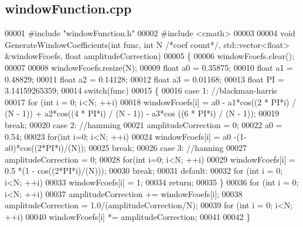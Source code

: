 \subsection{window\+Function.\+cpp}
\label{windowFunction_8cpp_source}

\begin{DoxyCode}
00001 \textcolor{preprocessor}{#include "windowFunction.h"}
00002 \textcolor{preprocessor}{#include <cmath>}
00003 
00004 \textcolor{keywordtype}{void} GenerateWindowCoefficients(\textcolor{keywordtype}{int} func, \textcolor{keywordtype}{int} N \textcolor{comment}{/*coef count*/}, std::vector<float> &windowFcoefs, \textcolor{keywordtype}{float} 
      amplitudeCorrection)
00005 \{
00006     windowFcoefs.clear();
00007 
00008     windowFcoefs.resize(N);
00009     \textcolor{keywordtype}{float} a0 = 0.35875;
00010     \textcolor{keywordtype}{float} a1 = 0.48829;
00011     \textcolor{keywordtype}{float} a2 = 0.14128;
00012     \textcolor{keywordtype}{float} a3 = 0.01168;
00013     \textcolor{keywordtype}{float} PI = 3.14159265359;
00014     \textcolor{keywordflow}{switch}(func)
00015     \{
00016     \textcolor{keywordflow}{case} 1: \textcolor{comment}{//blackman-harris}
00017             \textcolor{keywordflow}{for} (\textcolor{keywordtype}{int} i = 0; i<N; ++i)
00018                 windowFcoefs[i] = a0 - a1*cos((2 * PI*i) / (N - 1)) + a2*cos((4 * PI*i) / (N - 1)) - a3*cos
      ((6 * PI*i) / (N - 1));
00019             \textcolor{keywordflow}{break};
00020         \textcolor{keywordflow}{case} 2: \textcolor{comment}{//hamming}
00021             amplitudeCorrection = 0;
00022             a0 = 0.54;
00023             \textcolor{keywordflow}{for}(\textcolor{keywordtype}{int} i=0; i<N; ++i)
00024                 windowFcoefs[i] = a0 -(1-a0)*cos((2*PI*i)/(N));
00025             \textcolor{keywordflow}{break};
00026         \textcolor{keywordflow}{case} 3: \textcolor{comment}{//hanning}
00027             amplitudeCorrection = 0;
00028             \textcolor{keywordflow}{for}(\textcolor{keywordtype}{int} i=0; i<N; ++i)
00029                 windowFcoefs[i] = 0.5 *(1 - cos((2*PI*i)/(N)));
00030             \textcolor{keywordflow}{break};
00031         \textcolor{keywordflow}{default}:
00032             \textcolor{keywordflow}{for} (\textcolor{keywordtype}{int} i = 0; i<N; ++i)
00033                 windowFcoefs[i] = 1;
00034             \textcolor{keywordflow}{return};
00035     \}
00036     \textcolor{keywordflow}{for} (\textcolor{keywordtype}{int} i = 0; i<N; ++i)
00037         amplitudeCorrection += windowFcoefs[i];
00038     amplitudeCorrection = 1.0/(amplitudeCorrection/N);
00039     \textcolor{keywordflow}{for} (\textcolor{keywordtype}{int} i = 0; i<N; ++i)
00040         windowFcoefs[i] *= amplitudeCorrection;
00041 
00042 \}
\end{DoxyCode}
